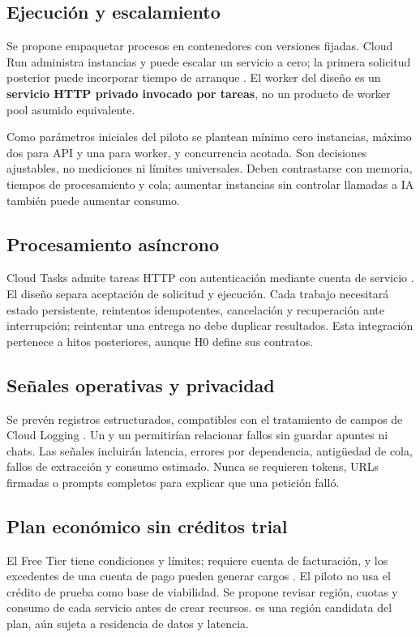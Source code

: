 \subsection{Ejecución y escalamiento}
Se propone empaquetar procesos en contenedores con versiones fijadas. Cloud Run administra instancias y puede escalar un servicio a cero; la primera solicitud posterior puede incorporar tiempo de arranque \cite{cloud-run}. El worker del diseño es un \textbf{servicio HTTP privado invocado por tareas}, no un producto de worker pool asumido equivalente.

Como parámetros iniciales del piloto se plantean mínimo cero instancias, máximo dos para API y una para worker, y concurrencia acotada. Son decisiones ajustables, no mediciones ni límites universales. Deben contrastarse con memoria, tiempos de procesamiento y cola; aumentar instancias sin controlar llamadas a IA también puede aumentar consumo.

\subsection{Procesamiento asíncrono}
Cloud Tasks admite tareas HTTP con autenticación mediante cuenta de servicio \cite{cloud-tasks}. El diseño separa aceptación de solicitud y ejecución. Cada trabajo necesitará estado persistente, reintentos idempotentes, cancelación y recuperación ante interrupción; reintentar una entrega no debe duplicar resultados. Esta integración pertenece a hitos posteriores, aunque H0 define sus contratos.

\subsection{Señales operativas y privacidad}
Se prevén registros estructurados, compatibles con el tratamiento de campos de Cloud Logging \cite{logging}. Un  y un  permitirían relacionar fallos sin guardar apuntes ni chats. Las señales incluirán latencia, errores por dependencia, antigüedad de cola, fallos de extracción y consumo estimado. Nunca se requieren tokens, URLs firmadas o prompts completos para explicar que una petición falló.

\subsection{Plan económico sin créditos trial}
El Free Tier tiene condiciones y límites; requiere cuenta de facturación, y los excedentes de una cuenta de pago pueden generar cargos \cite{free-tier}. El piloto no usa el crédito de prueba como base de viabilidad. Se propone revisar región, cuotas y consumo de cada servicio antes de crear recursos.  es una región candidata del plan, aún sujeta a residencia de datos y latencia.

